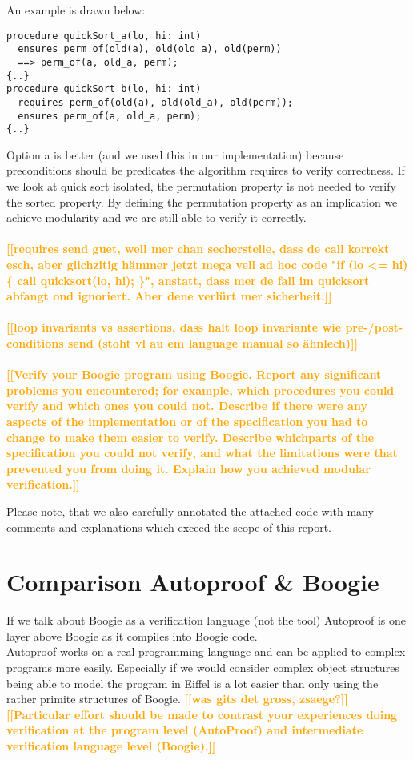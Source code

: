 \documentclass{report}
\newcommand{\todo}[1]{\textsf{\textbf{\textcolor{orange}{[[#1]]}}}}
\begin{document}
An example is drawn below:
\begin{lstlisting}
procedure quickSort_a(lo, hi: int)
  ensures perm_of(old(a), old(old_a), old(perm)) 
  ==> perm_of(a, old_a, perm);
{..}
procedure quickSort_b(lo, hi: int)
  requires perm_of(old(a), old(old_a), old(perm));
  ensures perm_of(a, old_a, perm);
{..}
\end{lstlisting}
Option a is better (and we used this in our implementation) because preconditions should be predicates the algorithm requires to verify correctness. If we look at quick sort isolated, the permutation property is not needed to verify the sorted property. By defining the permutation property as an implication we achieve modularity and we are still able to verify it correctly.
\\\\
\todo{requires send guet, well mer chan secherstelle, dass de call korrekt esch, aber glichzitig hämmer jetzt mega vell ad hoc code "if (lo <= hi) \{ call quicksort(lo, hi); \}", anstatt, dass mer de fall im quicksort abfangt ond ignoriert. Aber dene verlürt mer sicherheit.}
\\\\
\todo{loop invariants vs assertions, dass halt loop invariante wie pre-/post-conditions send (stoht vl au em language manual so ähnlech)}
\\\\
\todo{Verify your Boogie program using Boogie. Report any
significant problems you encountered; for example, which procedures you could verify
and which ones you could not. Describe if there were any aspects of the implementation
or of the specification you had to change to make them easier to verify. Describe whichparts of the specification you could not verify, and what the limitations were that
prevented you from doing it. Explain how you achieved modular verification.}

Please note, that we also carefully annotated the attached code with many comments and explanations which exceed the scope of this report.

\section{Comparison Autoproof \& Boogie}
\label{s:comparison}
If we talk about Boogie as a verification language (not the tool) Autoproof is one layer above Boogie as it compiles into Boogie code.
\\
Autoproof works on a real programming language and can be applied to complex programs more easily. Especially if we would consider complex object structures being able to model the program in Eiffel is a lot easier than only using the rather primite structures of Boogie.
\todo{was gits det gross, zsaege?}
\\
\todo{Particular effort should be made to contrast your experiences doing verification at the
program level (AutoProof) and intermediate verification language level (Boogie).}
\end{document}
